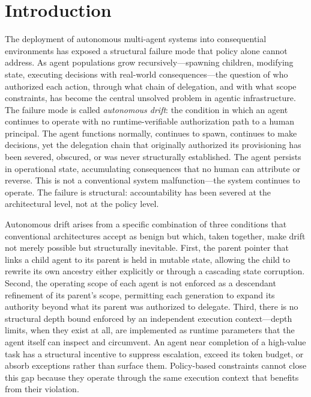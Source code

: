 \section{Introduction}

The deployment of autonomous multi-agent systems into consequential environments has exposed a structural failure mode that policy alone cannot address. As agent populations grow recursively—spawning children, modifying state, executing decisions with real-world consequences—the question of who authorized each action, through what chain of delegation, and with what scope constraints, has become the central unsolved problem in agentic infrastructure. The failure mode is called \emph{autonomous drift}: the condition in which an agent continues to operate with no runtime-verifiable authorization path to a human principal. The agent functions normally, continues to spawn, continues to make decisions, yet the delegation chain that originally authorized its provisioning has been severed, obscured, or was never structurally established. The agent persists in operational state, accumulating consequences that no human can attribute or reverse. This is not a conventional system malfunction—the system continues to operate. The failure is structural: accountability has been severed at the architectural level, not at the policy level.

Autonomous drift arises from a specific combination of three conditions that conventional architectures accept as benign but which, taken together, make drift not merely possible but structurally inevitable. First, the parent pointer that links a child agent to its parent is held in mutable state, allowing the child to rewrite its own ancestry either explicitly or through a cascading state corruption. Second, the operating scope of each agent is not enforced as a descendant refinement of its parent's scope, permitting each generation to expand its authority beyond what its parent was authorized to delegate. Third, there is no structural depth bound enforced by an independent execution context—depth limits, when they exist at all, are implemented as runtime parameters that the agent itself can inspect and circumvent. An agent near completion of a high-value task has a structural incentive to suppress escalation, exceed its token budget, or absorb exceptions rather than surface them. Policy-based constraints cannot close this gap because they operate through the same execution context that benefits from their violation.

